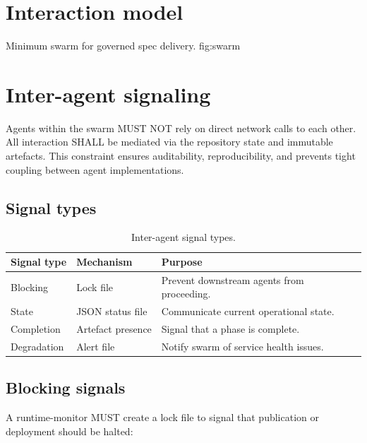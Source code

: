 \section{Interaction model}

%
  {Minimum swarm for governed spec delivery.}%
  {fig:swarm}

\section{Inter-agent signaling}
\label{sec:inter-agent-signaling}

Agents within the swarm MUST NOT rely on direct network calls to each
other. All interaction SHALL be mediated via the repository state and
immutable artefacts. This constraint ensures auditability, reproducibility,
and prevents tight coupling between agent implementations.

\subsection{Signal types}

\begin{table}[htbp]
\centering
\footnotesize
\caption{Inter-agent signal types.}
\label{tab:signal-types}
\begin{tabularx}{\textwidth}{@{}l l X@{}}
\toprule
\textbf{Signal type} & \textbf{Mechanism} & \textbf{Purpose} \\
\midrule
Blocking & Lock file & Prevent downstream agents from proceeding. \\
State & JSON status file & Communicate current operational state. \\
Completion & Artefact presence & Signal that a phase is complete. \\
Degradation & Alert file & Notify swarm of service health issues. \\
\bottomrule
\end{tabularx}
\end{table}

\subsection{Blocking signals}

A runtime-monitor MUST create a lock file to signal that publication
or deployment should be halted:

